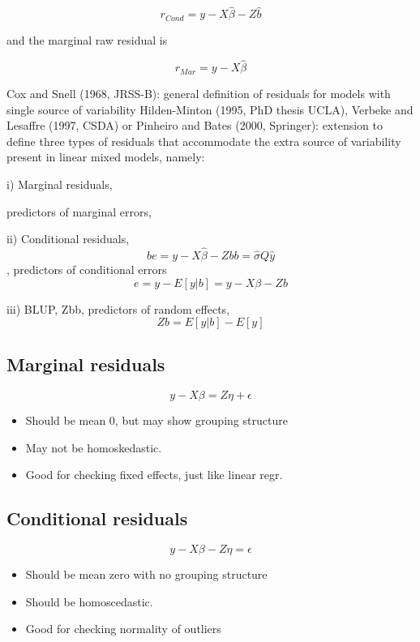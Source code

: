 \documentclass[Main.tex]{subfiles}
\begin{document}
	
	\[ r_{Cond} = y - X \hat{\beta} - Z \hat{b} \]
	
	and the marginal raw residual is
	
	
	
	\[ r_{Mar} = y - X \hat{\beta} \]
	
	\newpage
	
	Cox and Snell (1968, JRSS-B): general definition of residuals for
	models with single source of variability
	Hilden-Minton (1995, PhD thesis UCLA), Verbeke and Lesaffre
	(1997, CSDA) or Pinheiro and Bates (2000, Springer): extension to
	define three types of residuals that accommodate the extra source of
	variability present in linear mixed models, namely:
	
	i) Marginal residuals, 
	
	predictors of marginal errors, 
	
	
	ii) Conditional residuals, 
	\[be = y − X\hat{\beta} − Zbb = \hat{\sigma}Q\hat{y}\] , predictors of
	conditional errors 
	\[e = y − E[y|b] = y − X\beta − Zb\]
	
	iii) BLUP, Zbb, predictors of random effects,
	\[ Zb = E[y|b] − E[y]\]
	
	
	\newpage
	
	\subsection*{Marginal residuals}
	
	\[y - X\beta = Z \eta +\epsilon \]
	\begin{itemize}
		\item
		Should be mean 0, but may show grouping structure
		\item
		May not be homoskedastic.
		\item
		Good for checking fixed effects, just like linear regr.
	\end{itemize}
	\subsection*{Conditional residuals}
	\[y - X\beta - Z \eta = \epsilon \]
	\begin{itemize}
		\item
		Should be mean zero with no grouping structure
		\item
		Should be homoscedastic.
		\item
		Good for checking normality of outliers
	\end{itemize}
	
\end{document}
